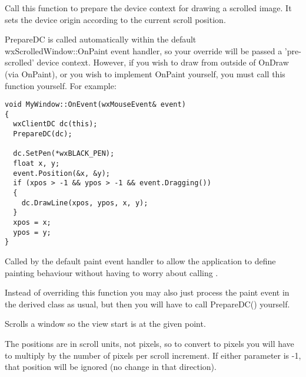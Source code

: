 
Call this function to prepare the device context for drawing a scrolled image. It
sets the device origin according to the current scroll position.

PrepareDC is called automatically within the default wxScrolledWindow::OnPaint event
handler, so your  override
will be passed a 'pre-scrolled' device context. However, if you wish to draw from
outside of OnDraw (via OnPaint), or you wish to implement OnPaint yourself, you must
call this function yourself. For example:

\begin{verbatim}
void MyWindow::OnEvent(wxMouseEvent& event)
{
  wxClientDC dc(this);
  PrepareDC(dc);

  dc.SetPen(*wxBLACK_PEN);
  float x, y;
  event.Position(&x, &y);
  if (xpos > -1 && ypos > -1 && event.Dragging())
  {
    dc.DrawLine(xpos, ypos, x, y);
  }
  xpos = x;
  ypos = y;
}
\end{verbatim}

\label{wxscrolledwindowondraw}


Called by the default paint event handler to allow the application to define
painting behaviour without having to worry about calling
.

Instead of overriding this function you may also just process the paint event
in the derived class as usual, but then you will have to call PrepareDC()
yourself.

\label{wxscrolledwindowscroll}


Scrolls a window so the view start is at the given point.





The positions are in scroll units, not pixels, so to convert to pixels you
will have to multiply by the number of pixels per scroll increment.
If either parameter is -1, that position will be ignored (no change in
that direction).

